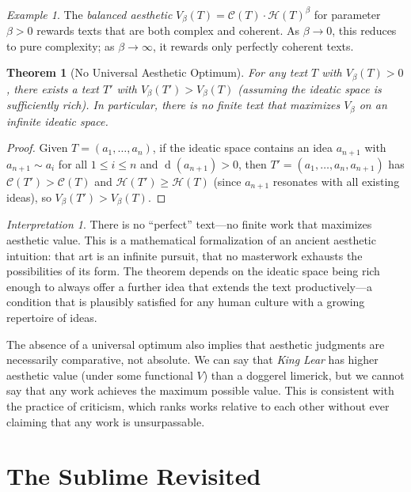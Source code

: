 \documentclass[11pt,openany]{book}
\theoremstyle{definition}
\theoremstyle{plain}
\newtheorem{theorem}[axiom]{Theorem}
\theoremstyle{remark}
\newtheorem{example}[axiom]{Example}
\newtheorem{interpretation}[axiom]{Interpretation}
\newcommand{\res}{\sim}                      %
\newcommand{\depth}{\operatorname{d}}       %
\begin{document}
\begin{example}
The \emph{balanced aesthetic} $V_{\beta}(T) = \mathcal{C}(T) \cdot \mathcal{H}(T)^{\beta}$ for parameter $\beta > 0$ rewards texts that are both complex and coherent. As $\beta \to 0$, this reduces to pure complexity; as $\beta \to \infty$, it rewards only perfectly coherent texts.
\end{example}

\begin{theorem}[No Universal Aesthetic Optimum]
For any text $T$ with $V_\beta(T) > 0$, there exists a text $T'$ with $V_\beta(T') > V_\beta(T)$ (assuming the ideatic space is sufficiently rich). In particular, there is no finite text that maximizes $V_\beta$ on an infinite ideatic space.
\end{theorem}

\begin{proof}
Given $T = (a_1, \ldots, a_n)$, if the ideatic space contains an idea $a_{n+1}$ with $a_{n+1} \res a_i$ for all $1 \leq i \leq n$ and $\depth(a_{n+1}) > 0$, then $T' = (a_1, \ldots, a_n, a_{n+1})$ has $\mathcal{C}(T') > \mathcal{C}(T)$ and $\mathcal{H}(T') \geq \mathcal{H}(T)$ (since $a_{n+1}$ resonates with all existing ideas), so $V_\beta(T') > V_\beta(T)$.
\end{proof}

\begin{interpretation}
There is no ``perfect'' text---no finite work that maximizes aesthetic value. This is a mathematical formalization of an ancient aesthetic intuition: that art is an infinite pursuit, that no masterwork exhausts the possibilities of its form. The theorem depends on the ideatic space being rich enough to always offer a further idea that extends the text productively---a condition that is plausibly satisfied for any human culture with a growing repertoire of ideas.

The absence of a universal optimum also implies that aesthetic judgments are necessarily comparative, not absolute. We can say that \emph{King Lear} has higher aesthetic value (under some functional $V$) than a doggerel limerick, but we cannot say that any work achieves the maximum possible value. This is consistent with the practice of criticism, which ranks works relative to each other without ever claiming that any work is unsurpassable.
\end{interpretation}

\section{The Sublime Revisited}
\end{document}
